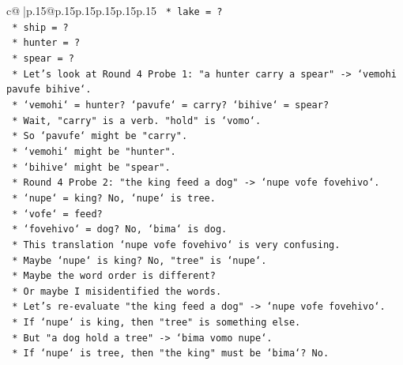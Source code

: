 \documentclass{article}
\begin{document}
{\begin{supertabular}{c@{$\;$}|p{.15\linewidth}@{}p{.15\linewidth}p{.15\linewidth}p{.15\linewidth}p{.15\linewidth}p{.15\linewidth}}
{{{\texttt{                        *   lake = ?} \\
\texttt{                        *   ship = ?} \\
\texttt{                        *   hunter = ?} \\
\texttt{                        *   spear = ?} \\
\texttt{                    *   Let's look at Round 4 Probe 1: "a hunter carry a spear" {-}> `vemohi pavufe bihive`.} \\
\texttt{                        *   `vemohi` = hunter? `pavufe` = carry? `bihive` = spear?} \\
\texttt{                        *   Wait, "carry" is a verb. "hold" is `vomo`.} \\
\texttt{                        *   So `pavufe` might be "carry".} \\
\texttt{                        *   `vemohi` might be "hunter".} \\
\texttt{                        *   `bihive` might be "spear".} \\
\texttt{                    *   Round 4 Probe 2: "the king feed a dog" {-}> `nupe vofe fovehivo`.} \\
\texttt{                        *   `nupe` = king? No, `nupe` is tree.} \\
\texttt{                        *   `vofe` = feed?} \\
\texttt{                        *   `fovehivo` = dog? No, `bima` is dog.} \\
\texttt{                        *   This translation `nupe vofe fovehivo` is very confusing.} \\
\texttt{                        *   Maybe `nupe` is king? No, "tree" is `nupe`.} \\
\texttt{                        *   Maybe the word order is different?} \\
\texttt{                        *   Or maybe I misidentified the words.} \\
\texttt{                        *   Let's re{-}evaluate "the king feed a dog" {-}> `nupe vofe fovehivo`.} \\
\texttt{                        *   If `nupe` is king, then "tree" is something else.} \\
\texttt{                        *   But "a dog hold a tree" {-}> `bima vomo nupe`.} \\
\texttt{                        *   If `nupe` is tree, then "the king" must be `bima`? No.} \\
}}}
\end{supertabular}}
\end{document}
